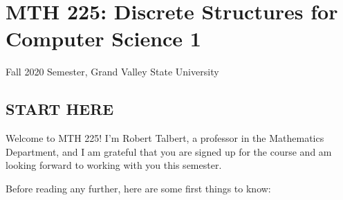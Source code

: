 \documentclass[]{article}
\date{}
\begin{document}
\hypertarget{mth-225-discrete-structures-for-computer-science-1}{%
\section{MTH 225: Discrete Structures for Computer Science
1}\label{mth-225-discrete-structures-for-computer-science-1}}

Fall 2020 Semester, Grand Valley State University

\hypertarget{start-here}{%
\subsection{START HERE}\label{start-here}}

Welcome to MTH 225! I'm Robert Talbert, a professor in the Mathematics
Department, and I am grateful that you are signed up for the course and
am looking forward to working with you this semester.

Before reading any further, here are some first things to know:
\end{document}
